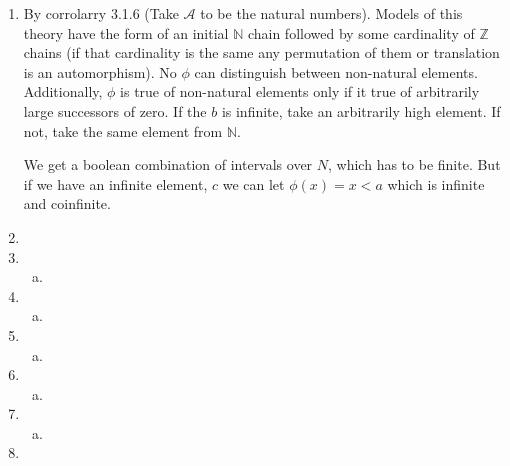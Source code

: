 \documentclass[10pt]{article}
\newcommand{\Z}{\mathbb{Z}}
\newcommand{\N}{\mathbb{N}}
\newcommand{\mcA}{\mathcal{A}}
\begin{document}
\begin{enumerate}[1.]
\begin{enumerate}[a)]
  \end{enumerate}

\item By corrolarry 3.1.6 (Take \(\mcA\) to be the natural numbers). Models of this theory have the form of an initial \(\N\) chain followed by some cardinality of \(\Z\) chains (if that cardinality is the same any permutation of them or translation is an automorphism). No \(\phi\) can distinguish between non-natural elements. Additionally, \(\phi\) is true of non-natural elements only if it true of arbitrarily large successors of zero. If the \(b\) is infinite, take an arbitrarily high element. If not, take the same element from \(\N\). 

We get a boolean combination of intervals over \(N\), which has to be finite. But if we have an infinite element, \(c\) we can let \(\phi(x) = x < a\) which is infinite and coinfinite. 

\item

\item
 
  \begin{enumerate}[a)] 
  \item 	
  \end{enumerate}

\item
 
  \begin{enumerate}[a)] 
  \item 	
  \end{enumerate}

\item
 
  \begin{enumerate}[a)] 
  \item 	
  \end{enumerate}

\item
 
  \begin{enumerate}[a)] 
  \item 	
  \end{enumerate}

\item
 
  \begin{enumerate}[a)] 
  \item 	
  \end{enumerate}

\item
 

\end{enumerate}
\end{document}
